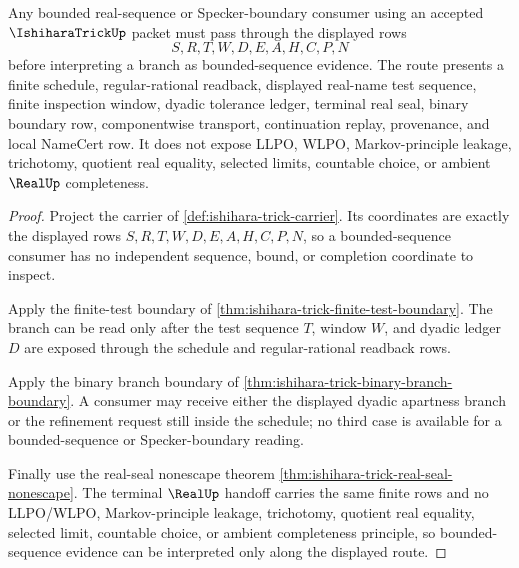 \begin{theorem}
\label{thm:ishihara-trick-bounded-sequence-route}
Any bounded real-sequence or Specker-boundary consumer using an accepted $\IshiharaTrickUp$ packet must pass through the displayed rows
$$
S,R,T,W,D,E,A,H,C,P,N
$$
before interpreting a branch as bounded-sequence evidence. The route presents a finite schedule, regular-rational readback, displayed real-name test sequence, finite inspection window, dyadic tolerance ledger, terminal real seal, binary boundary row, componentwise transport, continuation replay, provenance, and local NameCert row. It does not expose LLPO, WLPO, Markov-principle leakage, trichotomy, quotient real equality, selected limits, countable choice, or ambient $\RealUp$ completeness.
\end{theorem}
\begin{proof}
Project the carrier of \autoref{def:ishihara-trick-carrier}. Its coordinates are exactly the displayed rows $S,R,T,W,D,E,A,H,C,P,N$, so a bounded-sequence consumer has no independent sequence, bound, or completion coordinate to inspect.

Apply the finite-test boundary of \autoref{thm:ishihara-trick-finite-test-boundary}. The branch can be read only after the test sequence $T$, window $W$, and dyadic ledger $D$ are exposed through the schedule and regular-rational readback rows.

Apply the binary branch boundary of \autoref{thm:ishihara-trick-binary-branch-boundary}. A consumer may receive either the displayed dyadic apartness branch or the refinement request still inside the schedule; no third case is available for a bounded-sequence or Specker-boundary reading.

Finally use the real-seal nonescape theorem \autoref{thm:ishihara-trick-real-seal-nonescape}. The terminal $\RealUp$ handoff carries the same finite rows and no LLPO/WLPO, Markov-principle leakage, trichotomy, quotient real equality, selected limit, countable choice, or ambient completeness principle, so bounded-sequence evidence can be interpreted only along the displayed route.
\end{proof}

